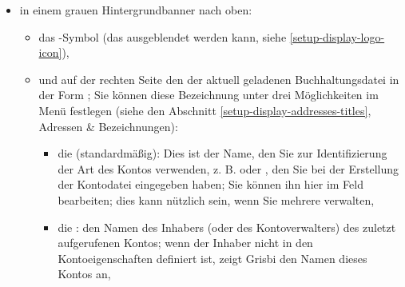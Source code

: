 \begin{itemize}
	\item in einem grauen Hintergrundbanner nach oben:%
		\begin{itemize}
			\item das -Symbol (das ausgeblendet werden kann, siehe \vref{setup-display-logo-icon}),
			\item und auf der rechten Seite den  der aktuell geladenen Buchhaltungsdatei in der Form ; Sie können diese Bezeichnung unter drei Möglichkeiten im Menü  festlegen (siehe den Abschnitt \vref{setup-display-addresses-titles}, Adressen \& Bezeichnungen):%
				\begin{itemize}
			 		\item die  (standardmäßig): Dies ist der Name, den Sie zur Identifizierung der Art des Kontos verwenden, z. B.  oder , den Sie bei der Erstellung der Kontodatei eingegeben haben; Sie können ihn hier im Feld  bearbeiten; dies kann nützlich sein, wenn Sie mehrere  verwalten,%
					\item die : den Namen des Inhabers (oder des Kontoverwalters) des zuletzt aufgerufenen Kontos; wenn der Inhaber nicht in den Kontoeigenschaften definiert ist, zeigt Grisbi den Namen dieses Kontos an,%

\end{itemize}
\end{itemize}
\end{itemize}
